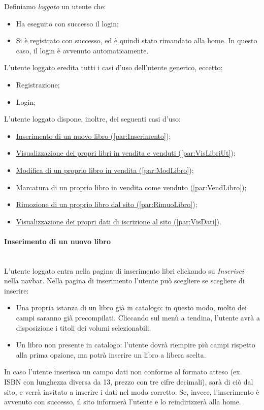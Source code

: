 Definiamo \textit{loggato} un utente che:
\begin{itemize}
	\item Ha eseguito con successo il login;
	\item Si è registrato con successo, ed è quindi stato rimandato alla home. In questo caso, il login è avvenuto automaticamente.
\end{itemize}

L'utente loggato eredita tutti i casi d'uso dell'utente generico, eccetto:
\begin{itemize}
	\item Registrazione;
	\item Login;
\end{itemize}

L'utente loggato dispone, inoltre, dei seguenti casi d'uso:
\begin{itemize}
	\item \hyperref[par:Inserimento]{Inserimento di un nuovo libro (\ref{par:Inserimento}});
	\item \hyperref[par:VisLibriUt]{Visualizzazione dei propri libri in vendita e venduti (\ref{par:VisLibriUt}});
	\item \hyperref[par:ModLibro]{Modifica di un proprio libro in vendita (\ref{par:ModLibro}});
	\item \hyperref[par:VendLibro]{Marcatura di un proprio libro in vendita come venduto (\ref{par:VendLibro}});
	\item \hyperref[par:RimuoLibro]{Rimozione di un proprio libro dal sito (\ref{par:RimuoLibro}});
	\item \hyperref[par:VisDati]{Visualizzazione dei propri dati di iscrizione al sito (\ref{par:VisDati}}).
\end{itemize}

\paragraph{Inserimento di un nuovo libro}\mbox{}\\
\label{par:Inserimento}
L'utente loggato entra nella pagina di inserimento libri clickando su \textit{Inserisci} nella navbar. Nella pagina di inserimento l'utente può scegliere se scegliere di inserire:
\begin{itemize}
	\item Una propria istanza di un libro già in catalogo: in questo modo, molto dei campi saranno già precompilati. Cliccando sul menù a tendina, l'utente avrà a disposizione i titoli dei volumi selezionabili.
	\item Un libro non presente in catalogo: l'utente dovrà riempire più campi rispetto alla prima opzione, ma potrà inserire un libro a libera scelta.
\end{itemize}
In caso l'utente inserisca un campo dati non conforme al formato atteso (ex. ISBN con lunghezza diversa da 13, prezzo con tre cifre decimali), sarà di ciò dal sito, e verrà invitato a inserire i dati nel modo corretto.
Se, invece, l'inserimento è avvenuto con successo, il sito informerà l'utente e lo reindirizzerà alla home.

